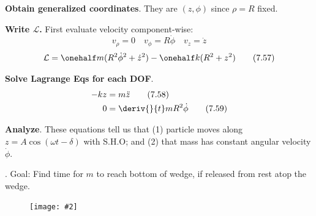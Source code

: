 \documentclass[10pt, twocolumn]{article}
\newcommand\myfig[2][0.3\textwidth]{\begin{figure}[h!]\centering\texttt{[image: \#2]}\end{figure}}
\newcommand{\myspace}{\vspace{3\bigskipamount}}
\newcommand\p{\Needspace{10\baselineskip} \noindent}
\newcommand\tlab[1]{\tag{#1}\label{#1}}
\begin{document}
\begin{compactitem}
	\item \textbf{Obtain generalized coordinates}. They are $(z, \phi)$ since $\rho =R$ fixed. 
	\item \textbf{Write $\mathcal L$.} First evaluate velocity component-wise:
	$$v_\rho = 0 \quad v_\phi = R\dot \phi \quad v_z = \dot z$$
	\begin{align}
		\mathcal L = \onehalf m(R^2 \dot{\phi}^2 + \dot z^2) - \onehalf k (R^2 + z^2) \tlab{7.57}
	\end{align}
	
	\item \textbf{Solve Lagrange Eqs for each DOF}. 
	\begin{align}
		-k z &= m \ddot z  \tlab{7.58} \\
		0 &= \deriv{}{t} m R^2 \dot \phi \tlab{7.59}
	\end{align}
	
	\item \textbf{Analyze}. These equations tell us that (1) particle moves along $z = A\cos(\omega t - \delta)$ with S.H.O; and (2) that mass has constant angular velocity $\dot \phi$. 
\end{compactitem}	

\myspace
\p {}. Goal: Find time for $m$ to reach bottom of wedge, if released from rest atop the wedge.
\myfig[0.3\textwidth]{BlockWedge.PNG}
\end{document}
